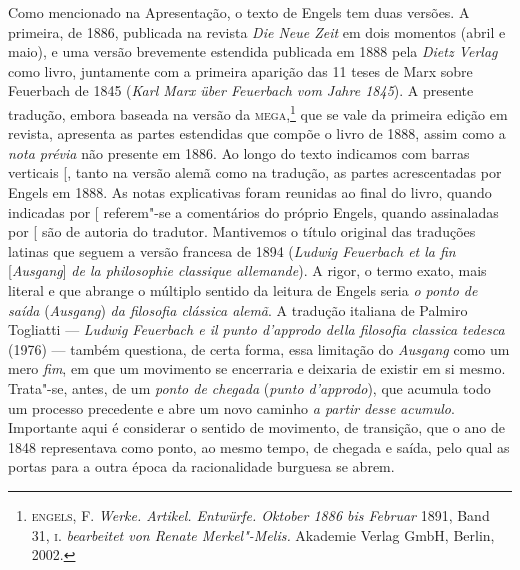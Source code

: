 Como mencionado na Apresentação, o texto de Engels tem duas versões. A primeira, de 1886, publicada na revista \emph{Die Neue Zeit} em dois momentos (abril e maio), e uma
versão brevemente estendida publicada em 1888 pela \emph{Dietz Verlag}
como livro, juntamente com a primeira aparição das 11 teses de Marx
sobre Feuerbach de 1845 (\emph{Karl Marx über Feuerbach vom Jahre
1845}). A presente tradução, embora baseada na versão da
\textsc{mega},\footnote[*]{\textsc{engels}, F. \emph{Werke. Artikel. Entwürfe.
Oktober 1886 bis Februar} 1891, Band 31, \textsc{i}. \emph{bearbeitet
von Renate Merkel"-Melis.} Akademie Verlag GmbH, Berlin, 2002.} que se
vale da primeira edição em revista, apresenta as partes estendidas que compõe o
livro de 1888, assim como a \emph{nota prévia} não presente em 1886. Ao
longo do texto indicamos com barras verticais {[}\textbar\textbar{]}, tanto na versão alemã como na
tradução, as partes acrescentadas por Engels em 1888. As notas explicativas foram reunidas ao final do livro, quando indicadas por {[}\versal{N.\,A.}{]} referem"-se a comentários do próprio Engels, quando assinaladas por  {[}\versal{N.\,T.}{]} são de autoria do tradutor. Mantivemos o título original das traduções latinas que
seguem a versão francesa de 1894 (\emph{Ludwig Feuerbach et la fin}
{[}\emph{Ausgang}{]} \emph{de la philosophie classique allemande}). A
rigor, o termo exato, mais literal e que abrange o múltiplo sentido da
leitura de Engels seria \emph{o ponto de saída} (\emph{Ausgang})
\emph{da filosofia clássica alemã}. A tradução italiana de Palmiro
Togliatti --- \emph{Ludwig Feuerbach e il punto d'approdo della filosofia
classica tedesca} (1976) --- também questiona, de certa forma, essa
limitação do \emph{Ausgang} como um mero \emph{fim}, em que um movimento
se encerraria e deixaria de existir em si mesmo. Trata"-se, antes, de um
\emph{ponto de chegada} (\emph{punto d'approdo}), que acumula todo um
processo precedente e abre um novo caminho \emph{a partir} \emph{desse}
\emph{acumulo}. Importante aqui é considerar o sentido de movimento, de
transição, que o ano de 1848 representava como ponto, ao mesmo tempo,
de chegada e saída, pelo qual as portas para a outra época da
racionalidade burguesa se abrem.
